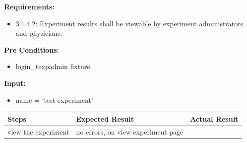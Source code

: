 \documentclass[letterpaper,10pt,english]{sphinxmanual}
\begin{document}
\begin{fulllineitems}
\label{STD/test_experiment:test_experiment.test_view_experiment_exp_admin}
\textbf{Requirements:}
\begin{itemize}
\item {} 
3.1.4.2: Experiment results shall be viewable by experiment administrators and physicians.

\end{itemize}

\textbf{Pre Conditions:}
\begin{itemize}
\item {} 
login\_texpadmin fixture

\end{itemize}

\textbf{Input:}
\begin{itemize}
\item {} 
name = `test experiment'

\end{itemize}

\begin{tabulary}{\linewidth}{|L|L|L|}
\hline
\textsf{\relax 
Steps
} & \textsf{\relax 
Expected Result
} & \textsf{\relax 
Actual Result
}\\
\hline
view the experiment
 & 
no errors, on view experiment page
 & \\
\hline\end{tabulary}


\end{fulllineitems}

\end{document}
